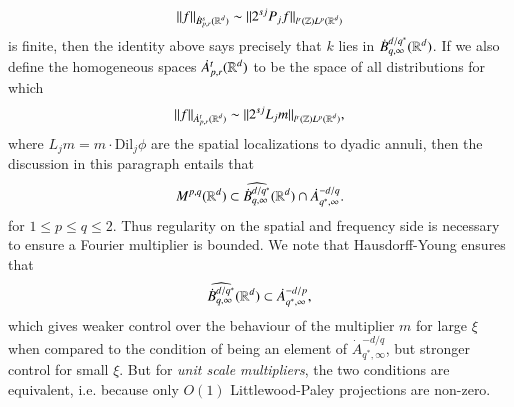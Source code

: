 %
\[ \| f \|_{\dot{B}^s_{p,r}(\operatorname{\mathbb{R}}^d)} \sim \| 2^{sj} P_j f \|_{l^r(\operatorname{\mathbb{Z}}) L^p(\operatorname{\mathbb{R}}^d)} \]
%
is finite, then the identity above says precisely that $k$ lies in $\dot{B}^{d/q^*}_{q,\infty}(\operatorname{\mathbb{R}}^d)$. If we also define the homogeneous spaces $\dot{A}^t_{p,r}(\operatorname{\mathbb{R}}^d)$ to be the space of all distributions for which
%
\[ \| f \|_{\dot{A}^t_{p,r}(\operatorname{\mathbb{R}}^d)} \sim \| 2^{sj} L_j m \|_{l^r(\operatorname{\mathbb{Z}}) L^p(\operatorname{\mathbb{R}}^d)}, \]
%
where $L_j m = m \cdot \text{Dil}_j \phi$ are the spatial localizations to dyadic annuli, then the discussion in this paragraph entails that
%
\[ M^{p,q}(\operatorname{\mathbb{R}}^d) \subset \widehat{\dot{B}^{d/q^*}_{q,\infty}}(\operatorname{\mathbb{R}}^d) \cap \dot{A}^{-d/q}_{q^*,\infty}. \]
%
for $1 \leq p \leq q \leq 2$. Thus regularity on the spatial and frequency side is necessary to ensure a Fourier multiplier is bounded. We note that Hausdorff-Young ensures that
%
\[ \widehat{\dot{B}^{d/q^*}_{q,\infty}}(\operatorname{\mathbb{R}}^d) \subset \dot{A}^{-d/p}_{q^*,\infty}, \]
%
which gives weaker control over the behaviour of the multiplier $m$ for large $\xi$ when compared to the condition of being an element of $\dot{A}^{-d/q}_{q^*,\infty}$, but stronger control for small $\xi$. But for \emph{unit scale multipliers}, the two conditions are equivalent, i.e. because only $O(1)$ Littlewood-Paley projections are non-zero.

%
%
%
%
%
%
%
%

